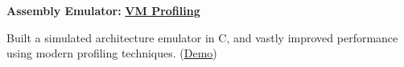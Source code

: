 \documentclass[10pt]{article}
\newenvironment{mylist}[1][]
{\itemize[nosep, wide=0pt, leftmargin=*, after=\strut]}
{\enditemize}
\begin{document}
\begin{minipage}[t]{\linewidth}
    \textbf{Assembly Emulator:} \href{https://github.com/liam-strand/comp-40-VM-Profiling}{\textbf{VM Profiling}}
    \begin{mylist}
        \item Built a simulated architecture emulator in C, and vastly improved performance using modern profiling techniques. (\href{https://youtu.be/OnzkSmFvxiM}{Demo})
    \end{mylist}
\end{minipage}



\end{document}
